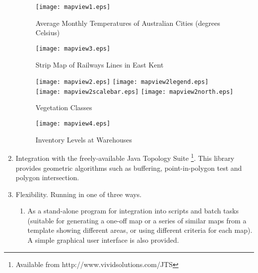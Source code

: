\begin{enumerate}
\begin{figure}
\texttt{[image: mapview1.eps]}
\caption[Average Monthly Temperatures]{Average Monthly Temperatures of Australian Cities (degrees Celsius)}
\label{mapview1}
\end{figure}

\begin{figure}
\texttt{[image: mapview3.eps]}
\caption{Strip Map of Railways Lines in East Kent}
\label{mapview3}
\end{figure}

\begin{figure}

\texttt{[image: mapview2.eps]}
\texttt{[image: mapview2legend.eps]}
\vspace{1pt}
\texttt{[image: mapview2scalebar.eps]}
\texttt{[image: mapview2north.eps]}
\caption{Vegetation Classes}
\label{mapview2}
\end{figure}

\begin{figure}
\texttt{[image: mapview4.eps]}
\caption{Inventory Levels at Warehouses}
\label{mapview4}
\end{figure}


\item
Integration with the freely-available
Java Topology Suite
\footnote{Available from http://www.vividsolutions.com/JTS}.
This library provides geometric algorithms
such as buffering, point-in-polygon test and polygon intersection.

\item
Flexibility.  Running in one of three ways.

\begin{enumerate}
\item
As a stand-alone program for integration into
scripts and batch tasks (suitable for generating a one-off
map or a series of similar maps from a template
showing different areas, or using different criteria for each map).
A simple graphical user interface is also provided.


\end{enumerate}
\end{enumerate}

